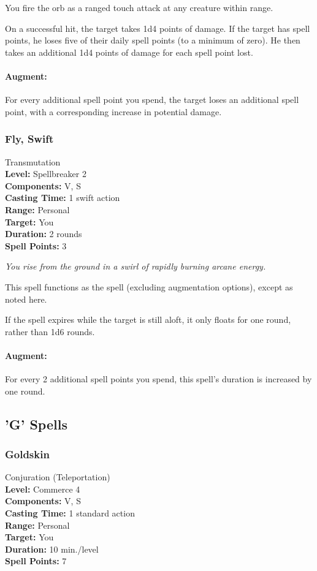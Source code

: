 You fire the orb as a ranged touch attack at any creature within range.

On a successful hit, the target takes 1d4 points of damage. If the target has spell points, he loses five of their daily spell points (to a minimum of zero). He then takes an additional 1d4 points of damage for each spell point lost.

\paragraph{Augment:} For every additional spell point you spend, the target loses an additional spell point, with a corresponding increase in potential damage.

\subsubsection[Swift Fly]{Fly, Swift}
\label{Spell:SwiftFly}
Transmutation
\\ \textbf{Level:} Spellbreaker 2
\\ \textbf{Components:} V, S
\\ \textbf{Casting Time:} 1 swift action
\\ \textbf{Range:} Personal
\\ \textbf{Target:} You
\\ \textbf{Duration:} 2 rounds
\\ \textbf{Spell Points:} 3

\emph{You rise from the ground in a swirl of rapidly burning arcane energy.}

This spell functions as the  spell (excluding augmentation options), except as noted here.

If the spell expires while the target is still aloft, it only floats for one round, rather than 1d6 rounds.

\paragraph{Augment:} For every 2 additional spell points you spend, this spell's duration is increased by one round.
\subsection{'G' Spells}
\subsubsection{Goldskin}
\label{Spell:Goldskin}
Conjuration (Teleportation)
\\ \textbf{Level:} Commerce 4
\\ \textbf{Components:} V, S
\\ \textbf{Casting Time:} 1 standard action
\\ \textbf{Range:} Personal
\\ \textbf{Target:} You
\\ \textbf{Duration:} 10 min./level
\\ \textbf{Spell Points:} 7

